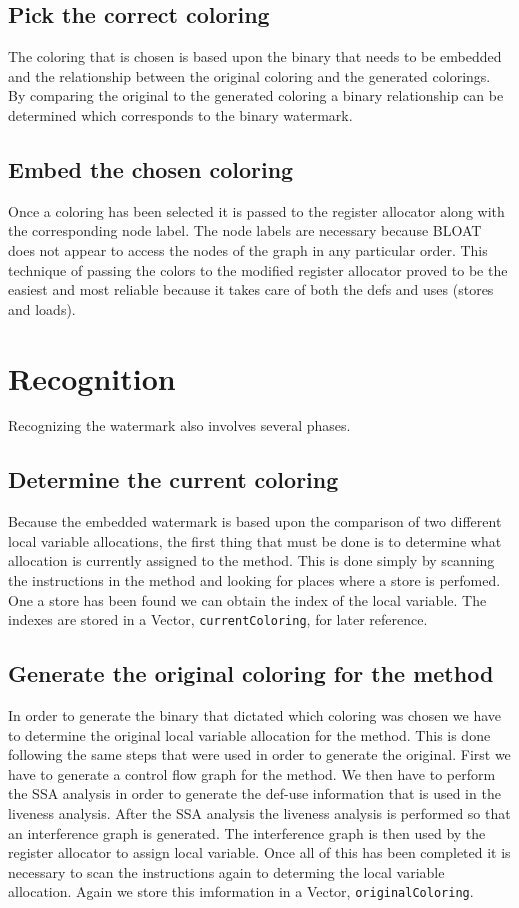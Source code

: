 \subsection{Pick the correct coloring}
The coloring that is chosen is based upon the binary that needs to be 
embedded and the relationship between the original coloring and the 
generated colorings. By comparing the original to the generated coloring a 
binary relationship can be determined which corresponds to the binary 
watermark.


\subsection{Embed the chosen coloring}
Once a coloring has been selected it is passed to the register allocator 
along with the corresponding node label. The node labels are necessary 
because BLOAT does not appear to access the nodes of the graph in any 
particular order. This technique of passing the colors to the modified 
register allocator proved to be the easiest and most reliable because it 
takes care of both the defs and uses (stores and loads).


\section{Recognition}
Recognizing the watermark also involves several phases.

\subsection{Determine the current coloring}
Because the embedded watermark is based upon the comparison of two different local variable allocations, the first thing that must be done is to determine what allocation is currently assigned to the method. This is done simply by scanning the instructions in the method and looking for places where a store is perfomed. One a store has been found we can obtain the index of the local variable. The indexes are stored in a Vector, \texttt{currentColoring}, for later reference.

\subsection{Generate the original coloring for the method}
In order to generate the binary that dictated which coloring was chosen we have to determine the original local variable allocation for the method. This is done following the same steps that were used in order to generate the original. First we have to generate a control flow graph for the method. We then have to perform the SSA analysis in order to generate the def-use information that is used in the liveness analysis. After the SSA analysis the liveness analysis is performed so that an interference graph is generated. The interference graph is then used by the register allocator to assign local variable. Once all of this has been completed it is necessary to scan the instructions again to determing the local variable allocation. Again we store this imformation in a Vector, \texttt{originalColoring}.


